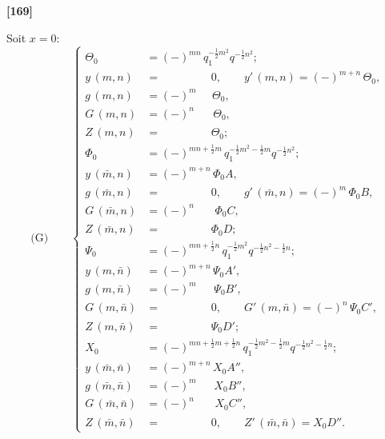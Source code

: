\documentclass[11pt,a4paper]{article}
\begin{document}
\textbf{[169]}

Soit $x = 0$:
\begin{equation*}
\text{(G)}\qquad
\left\{
\begin{aligned}
\Theta_0 &= (-)^{mn}\, q_1^{-\frac{1}{2}m^2} q^{-\frac{1}{2}n^2};\\
y\, (m, n) &= \phantom{(-)^{m+n}} 0,\qquad y'\, (m, n) = (-)^{m+n}\, \Theta_0,\\
g\, (m, n) &= (-)^m \phantom{+n} \Theta_0,\\
G\, (m, n) &= (-)^n \phantom{+m} \Theta_0,\\
Z\, (m, n) &= \phantom{(-)^{m+n}} \Theta_0;\\
\Phi_0 &= (-)^{mn+\frac{1}{2}m}\, q_1^{-\frac{1}{2}m^2 - \frac{1}{2}m} q^{-\frac{1}{2}n^2};\\
y\, (\bar{m}, n) &= (-)^{m+n}\, \Phi_0 A,\\
g\, (\bar{m}, n) &= \phantom{(-)^{m+n}} 0,\qquad g'\, (\bar{m}, n) = (-)^m\, \Phi_0 B,\\
G\, (\bar{m}, n) &= (-)^n \phantom{+m}\, \Phi_0 C,\\
Z\, (\bar{m}, n) &= \phantom{(-)^{m+n}} \Phi_0 D;\\
\Psi_0 &= (-)^{mn+\frac{1}{2}n}\, q_1^{-\frac{1}{2}m^2} q^{-\frac{1}{2}n^2 - \frac{1}{2}n};\\
y\, (m, \bar{n}) &= (-)^{m+n}\, \Psi_0 A',\\
g\, (m, \bar{n}) &= (-)^m \phantom{+n}\, \Psi_0 B',\\
G\, (m, \bar{n}) &= \phantom{(-)^{m+n}} 0,\qquad G'\, (m, \bar{n}) = (-)^n\, \Psi_0 C',\\
Z\, (m, \bar{n}) &= \phantom{(-)^{m+n}} \Psi_0 D';\\
X_0 &= (-)^{mn+\frac{1}{2}m+\frac{1}{2}n}\, q_1^{-\frac{1}{2}m^2 - \frac{1}{2}m} q^{-\frac{1}{2}n^2 - \frac{1}{2}n};\\
y\, (\bar{m}, \bar{n}) &= (-)^{m+n}\, X_0 A'',\\
g\, (\bar{m}, \bar{n}) &= (-)^m \phantom{+n}\, X_0 B'',\\
G\, (\bar{m}, \bar{n}) &= (-)^n \phantom{+m}\, X_0 C'',\\
Z\, (\bar{m}, \bar{n}) &= \phantom{(-)^{m+n}} 0,\qquad Z'\, (\bar{m}, \bar{n}) = X_0 D''.
\end{aligned}
\right.
\end{equation*}
\end{document}
